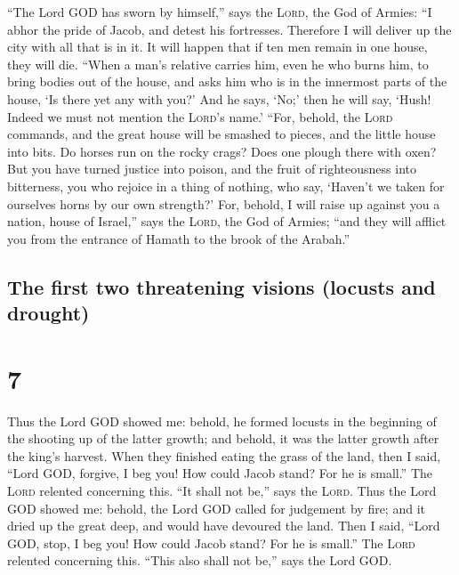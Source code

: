  ``The Lord GOD has sworn by himself,'' says the
\textsc{Lord}, the God of Armies: ``I abhor the pride of Jacob, and
detest his fortresses. Therefore I will deliver up the city with all
that is in it.  It will happen that if ten men remain in
one house, they will die.  ``When a man's relative
carries him, even he who burns him, to bring bodies out of the house,
and asks him who is in the innermost parts of the house, `Is there yet
any with you?' And he says, `No;' then he will say, `Hush! Indeed we
must not mention the \textsc{Lord}'s name.'  ``For,
behold, the \textsc{Lord} commands, and the great house will be smashed
to pieces, and the little house into bits.  Do horses run
on the rocky crags? Does one plough there with oxen? But you have turned
justice into poison, and the fruit of righteousness into bitterness,
 you who rejoice in a thing of nothing, who say, `Haven't
we taken for ourselves horns by our own strength?'  For,
behold, I will raise up against you a nation, house of Israel,'' says
the \textsc{Lord}, the God of Armies; ``and they will afflict you from
the entrance of Hamath to the brook of the Arabah.''

\hypertarget{the-first-two-threatening-visions-locusts-and-drought}{%
\subsection{The first two threatening visions (locusts and
drought)}\label{the-first-two-threatening-visions-locusts-and-drought}}

\hypertarget{section-6}{%
\section{7}\label{section-6}}

 Thus the Lord GOD showed me: behold, he formed locusts in
the beginning of the shooting up of the latter growth; and behold, it
was the latter growth after the king's harvest.  When they
finished eating the grass of the land, then I said, ``Lord GOD, forgive,
I beg you! How could Jacob stand? For he is small.''  The
\textsc{Lord} relented concerning this. ``It shall not be,'' says the
\textsc{Lord}.  Thus the Lord GOD showed me: behold, the
Lord GOD called for judgement by fire; and it dried up the great deep,
and would have devoured the land.  Then I said, ``Lord
GOD, stop, I beg you! How could Jacob stand? For he is small.''
 The \textsc{Lord} relented concerning this. ``This also
shall not be,'' says the Lord GOD.

